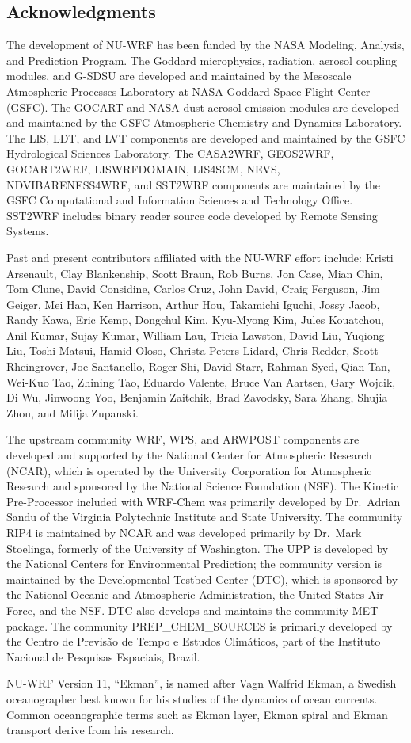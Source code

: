 \subsection{Acknowledgments}
The development of NU-WRF has been funded by the NASA Modeling, Analysis, and 
Prediction Program. The Goddard microphysics, radiation, aerosol coupling 
modules, and G-SDSU are developed and maintained by the Mesoscale 
Atmospheric Processes Laboratory at NASA Goddard Space Flight Center (GSFC). 
The GOCART and NASA dust aerosol emission modules are developed and maintained
by the GSFC Atmospheric Chemistry and Dynamics Laboratory. The LIS, LDT, and 
LVT components are developed and maintained by the GSFC Hydrological Sciences 
Laboratory. The CASA2WRF, GEOS2WRF, GOCART2WRF, LISWRFDOMAIN, LIS4SCM, 
NEVS, NDVIBARENESS4WRF, and SST2WRF components are maintained by the GSFC 
Computational and Information Sciences and Technology Office. SST2WRF includes
binary reader source code developed by Remote Sensing Systems.

Past and present contributors affiliated with the NU-WRF effort include:
Kristi Arsenault, Clay Blankenship, Scott Braun, Rob Burns, Jon Case, Mian 
Chin, Tom Clune, David Considine, Carlos Cruz, John David, Craig Ferguson, Jim Geiger, 
Mei Han, Ken Harrison, Arthur Hou, Takamichi Iguchi, Jossy Jacob, Randy Kawa, 
Eric Kemp, Dongchul Kim, Kyu-Myong Kim, Jules Kouatchou, Anil Kumar, Sujay 
Kumar, William Lau, Tricia Lawston, David Liu, Yuqiong Liu, Toshi Matsui, 
Hamid Oloso, Christa Peters-Lidard, Chris Redder, Scott Rheingrover, Joe 
Santanello, Roger Shi, David Starr, Rahman Syed, Qian Tan, Wei-Kuo Tao, 
Zhining Tao, Eduardo Valente, Bruce Van Aartsen, Gary Wojcik, Di Wu,  Jinwoong Yoo, Benjamin Zaitchik, Brad Zavodsky, Sara Zhang, Shujia Zhou, and Milija Zupanski.

The upstream community WRF, WPS, and ARWPOST components are developed and 
supported by the National Center for Atmospheric Research (NCAR), which is 
operated by the University Corporation for Atmospheric Research and sponsored
by the National Science Foundation (NSF). The Kinetic Pre-Processor included 
with WRF-Chem was primarily developed by Dr.~Adrian Sandu of the Virginia 
Polytechnic Institute and State University. The community RIP4 is maintained 
by NCAR and was developed primarily by Dr.~Mark Stoelinga, formerly of the 
University of Washington. The UPP is developed by the National Centers 
for Environmental Prediction; the community version is maintained by the 
Developmental Testbed Center (DTC), which is sponsored by the National Oceanic
and Atmospheric Administration, the United States Air Force, and the NSF. DTC 
also develops and maintains the community MET package.  The community 
PREP\_CHEM\_SOURCES is primarily developed by the Centro de Previs\~{a}o de 
Tempo e Estudos Clim\'{a}ticos, part of the Instituto Nacional de Pesquisas 
Espaciais, Brazil.

NU-WRF Version 11, ``Ekman'', is named after Vagn Walfrid Ekman, a Swedish oceanographer
best known for his studies of the dynamics of ocean currents. Common oceanographic terms
such as Ekman layer, Ekman spiral and Ekman transport derive from his research.
